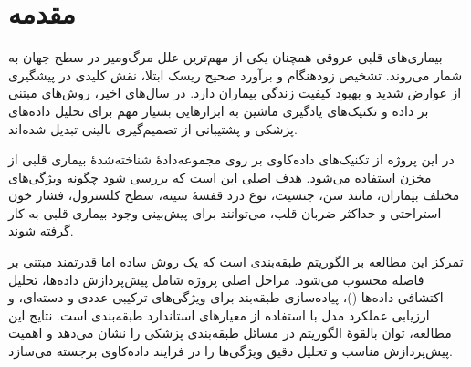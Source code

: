 \section{مقدمه}

بیماری‌های قلبی عروقی همچنان یکی از مهم‌ترین علل مرگ‌ومیر در سطح جهان به شمار می‌روند.
تشخیص زودهنگام و برآورد صحیح ریسک ابتلا، نقش کلیدی در پیشگیری از عوارض شدید و بهبود
کیفیت زندگی بیماران دارد. در سال‌های اخیر، روش‌های مبتنی بر داده و تکنیک‌های یادگیری
ماشین به ابزارهایی بسیار مهم برای تحلیل داده‌های پزشکی و پشتیبانی از تصمیم‌گیری بالینی
تبدیل شده‌اند.

در این پروژه از تکنیک‌های داده‌کاوی بر روی مجموعه‌دادهٔ شناخته‌شدهٔ بیماری قلبی از مخزن
 استفاده می‌شود. هدف اصلی این است که بررسی شود چگونه
ویژگی‌های مختلف بیماران، مانند سن، جنسیت، نوع درد قفسهٔ سینه، سطح کلسترول، فشار خون
استراحتی و حداکثر ضربان قلب، می‌توانند برای پیش‌بینی وجود بیماری قلبی به کار گرفته شوند.

تمرکز این مطالعه بر الگوریتم طبقه‌بندی  است که یک روش
ساده اما قدرتمند مبتنی بر فاصله محسوب می‌شود. مراحل اصلی پروژه شامل پیش‌پردازش داده‌ها،
تحلیل اکتشافی داده‌ها ()، پیاده‌سازی طبقه‌بند  برای ویژگی‌های ترکیبی
عددی و دسته‌ای، و ارزیابی عملکرد مدل با استفاده از معیارهای استاندارد طبقه‌بندی است.
نتایج این مطالعه، توان بالقوهٔ الگوریتم  در مسائل طبقه‌بندی پزشکی را نشان می‌دهد
و اهمیت پیش‌پردازش مناسب و تحلیل دقیق ویژگی‌ها را در فرایند داده‌کاوی برجسته می‌سازد.